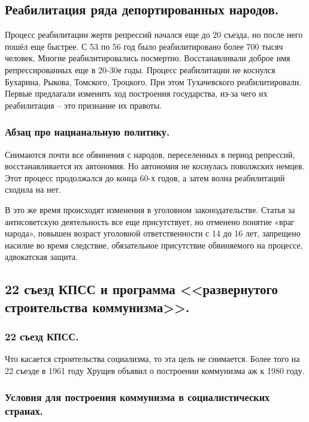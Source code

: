 \subsection{Реабилитация  ряда депортированных народов.}

Процесс реабилитации жертв репрессий начался еще до 20 съезда, но после него пошёл еще быстрее. С 53 по 56 год было реабилитировано более 700 тысяч человек. Многие реабилитировались посмертно. Восстанавливали доброе имя репрессированных еще в 20-30е годы. Процесс реабилитации не коснулся Бухарина, Рыкова, Томского, Троцкого. При этом Тухачевского реабилитировали. Первые предлагали изменить ход построения государства, из-за чего их реабилитация – это признание их правоты. 

\subsubsection{\textbf{Абзац про нацианальную политику.}}
Снимаются почти все обвинения с народов, переселенных в период репрессий, восстанавливается их автономия. Но автономия не коснулась поволжских немцев. Этот процесс продолжался до конца 60-х годов, а затем волна реабилитаций сходила на нет.

В это же время происходят изменения в уголовном законодательстве. Статья за антисоветскую деятельность все еще присутствует, но отменено понятие «враг народа», повышен возраст уголовной ответственности с 14 до 16 лет, запрещено насилие во время следствие, обязательное присутствие обвиняемого на процессе, адвокатская защита.

\subsection{22 съезд КПСС и программа <<развернутого строительства коммунизма>>.}

\subsubsection{\textbf{22 съезд КПСС.}}

Что касается строительства социализма, то эта цель не снимается. Более того на 22 съезде в 1961 году Хрущев объявил о построении коммунизма аж к 1980 году. 

\subsubsection{\textbf{Условия для построения коммунизма в социалистических странах.}}


